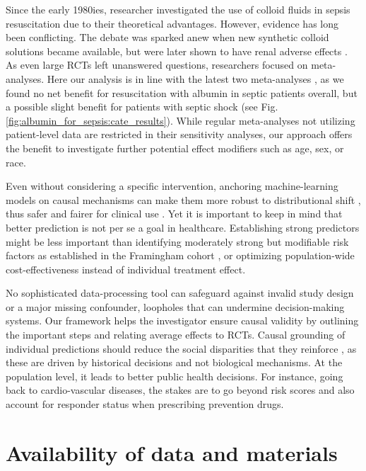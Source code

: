 \documentclass[10pt,letterpaper]{article}
\begin{document}
Since the early 1980ies, researcher investigated the use of colloid fluids in
sepsis resuscitation due to their theoretical advantages. However, evidence has
long been conflicting. The debate was sparked anew when new synthetic colloid
solutions became available, but were later shown to have renal adverse effects
\cite{xu2014comparison}. As even large RCTs left unanswered questions,
researchers focused on meta-analyses. Here our analysis is in line with the
latest two meta-analyses \cite{xu2014comparison,li2020resuscitation}, as we
found no net benefit for resuscitation with albumin in septic patients overall,
but a possible slight benefit for patients with septic shock (see Fig.
\ref{fig:albumin_for_sepsis:cate_results}). While regular meta-analyses not
utilizing patient-level data are restricted in their sensitivity analyses, our
approach offers the benefit to investigate further potential effect modifiers
such as age, sex, or race.

Even without considering a specific intervention, anchoring
machine-learning models on
causal mechanisms can make them more robust to distributional shift \cite{scholkopf2021toward},
thus safer and fairer for clinical use
\cite{richens2020improving,plecko2022causal}.
%
Yet it is important to keep in mind that better prediction is not per se
a goal in healthcare.
%
Establishing strong predictors might be less important than identifying
moderately strong but modifiable risk factors as established in the Framingham
cohort \cite{brand1976multivariate}, or optimizing population-wide cost-effectiveness instead of individual treatment effect.

No sophisticated data-processing tool can safeguard against
invalid study design or a major missing confounder, loopholes that can
undermine decision-making systems. Our framework helps the investigator
ensure
causal validity by outlining the important steps and relating average effects to
RCTs. Causal grounding of individual predictions should reduce the social
disparities that they reinforce
\cite{rajkomar2018ensuring,mitra2022future,ehrmann2023making}, as these are driven by
historical decisions and not biological mechanisms. At the population
level, it leads to better public health decisions. For instance, going
back to cardio-vascular diseases, the stakes are to go beyond risk
scores and also account for responder status when prescribing prevention
drugs.


\section*{Availability of data and materials}
\end{document}
